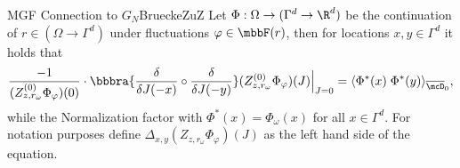 \begin{mpos}{MGF Connection to $G_N$}{BrueckeZuZ}
    Let $\Phi:\Omega\to(\Gamma^d\to\R^d)$ be the continuation of $r\in(\Omega\to\Gamma^d)$ under fluctuations $\varphi\in\mbbF(r)$, then for locations $x,y\in \Gamma^d$ it holds that
    \[
        \frac{-1}{(Z_{z,r_\omega}^{(0)}\Phi_\varphi)(0)}\cdot\bbbra{\frac{\delta}{\delta J(-x)}\circ\frac{\delta}{\delta J(-y)}}(Z_{z,r_\omega}^{(0)}\Phi_\varphi)(J)\Big|_{J=0} = \langle\Phi^*(x)\;\Phi^*(y)\rangle_{\overline\mcD_0},
    \]
    while the Normalization factor 
    with $\Phi^*(x) = \Phi_\omega(x)$ for all $x\in\Gamma^d$. For notation purposes define $\Delta_{x,y}(Z_{z,r_\omega}\Phi_\varphi)(J)$ as the left hand side of the equation.
\end{mpos}